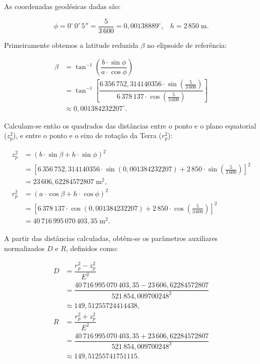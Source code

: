 \noindent
As coordenadas geodésicas dadas são:

\[
\phi = 0^\circ\,0'\,5'' = \dfrac{5}{3\,600} = 0{,}00138889^\circ \text{,} \quad h = 2\,850 \; \text{m} \text{.}
\]

\noindent
Primeiramente obtemos a latitude reduzida \(\beta\) no elipsoide de referência:

\[
\begin{aligned}
   \beta &= \tan^{-1}\left( \dfrac{b \cdot \sin \phi}{a \cdot \cos \phi} \right) \\
         &= \tan^{-1}\left[ \dfrac{6\,356\,752{,}314140356 \cdot \sin\left(\tfrac{5}{3\,600}\right)}{6\,378\,137 \cdot \cos\left(\tfrac{5}{3\,600}\right)} \right] \\
         &\approx 0{,}001384232207^\circ \text{.}
\end{aligned}
\]

\noindent
Calculam-se então os quadrados das distâncias entre o ponto e o plano equatorial (\(z_p^2\)), e entre o ponto e o eixo de rotação da Terra (\(r_p^2\)):



\[
\begin{aligned}
   z_p^2 &= \left( b \cdot \sin\beta + h \cdot \sin\phi \right)^2 \\
         &= \left[ 6\,356\,752{,}314140356 \cdot \sin(0{,}001384232207) + 2\,850 \cdot \sin\left(\tfrac{5}{3\,600}\right) \right]^2 \\
         &= 23\,606{,}62284572807 \; \text{m}^2 \text{,} \\
   r_p^2 &= \left( a \cdot \cos\beta + h \cdot \cos\phi \right)^2 \\
         &= \left[6\,378\,137 \cdot \cos(0{,}001384232207) + 2\,850 \cdot \cos\left(\tfrac{5}{3\,600}\right)\right]^2 \\
         &= 40\,716\,995\,070\,403{,}35 \; \text{m}^2 \text{.}
\end{aligned}
\]

\noindent
A partir das distâncias calculadas, obtêm-se os parâmetros auxiliares normalizados \(D\) e \(R\), definidos como:


\[
\begin{aligned}
   D &= \dfrac{r_p^2 - z_p^2}{E^2} \\
     &= \dfrac{40\,716\,995\,070\,403{,}35 - 23\,606{,}62284572807}{521\,854{,}009700248^2} \\
     &\approx 149{,}51255724414438 \text{,} \\
   R &= \dfrac{r_p^2 + z_p^2}{E^2} \\
     &= \dfrac{40\,716\,995\,070\,403{,}35 + 23\,606{,}62284572807}{521\,854{,}009700248^2} \\
     &\approx 149{,}51255741751115 \text{.}
\end{aligned}
\]

